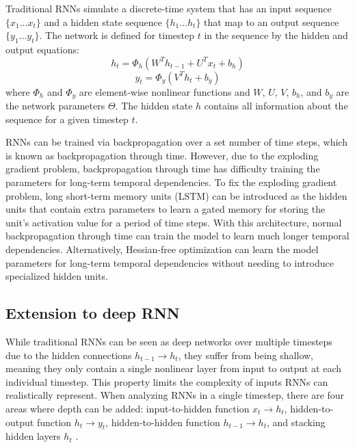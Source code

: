 Traditional RNNs simulate a discrete-time system that has an input sequence \(\{x_1...x_t\}\) and a hidden state sequence \(\{h_1...h_t\}\) that map to an output sequence \(\{y_1...y_t\}\). The network is defined for timestep \(t\) in the sequence by the hidden and output equations:
\begin{equation}
	h_t = \Phi_h(W^Th_{t-1} + U^Tx_t + b_h)
\end{equation}
\begin{equation}
	y_t = \Phi_y(V^Th_t + b_y)
\end{equation}
where \(\Phi_h\) and \(\Phi_y\) are element-wise nonlinear functions and \(W\), \(U\), \(V\), \(b_h\), and \(b_y\) are the network parameters \(\Theta\). The hidden state \(h\) contains all information about the sequence for a given timestep \(t\).

RNNs can be trained via backpropagation over a set number of time steps, which is known as backpropagation through time. However, due to the exploding gradient problem, backpropagation through time has difficulty training the parameters for long-term temporal dependencies. To fix the exploding gradient problem, long short-term memory units (LSTM) \cite{lstm} can be introduced as the hidden units that contain extra parameters to learn a gated memory for storing the unit's activation value for a period of time steps. With this architecture, normal backpropagation through time can train the model to learn much longer temporal dependencies. Alternatively, Hessian-free optimization \cite{hessian_free} can learn the model parameters for long-term temporal dependencies without needing to introduce specialized hidden units.

\subsection{Extension to deep RNN}\label{deep_rnn}
While traditional RNNs can be seen as deep networks over multiple timesteps due to the hidden connections \(h_{t-1} \rightarrow h_t\), they suffer from being shallow, meaning they only contain a single nonlinear layer from input to output at each individual timestep. This property limits the complexity of inputs RNNs can realistically represent. When analyzing RNNs in a single timestep, there are four areas where depth can be added: input-to-hidden function \(x_t \rightarrow h_t\), hidden-to-output function \(h_t \rightarrow y_t\), hidden-to-hidden function \(h_{t-1} \rightarrow h_t\), and stacking hidden layers \(h_t\) \cite{deep_rnn}.

